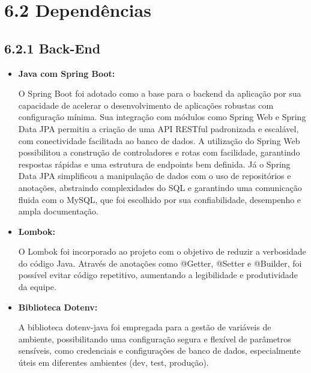\documentclass[12pt,a4paper]{report}
\begin{document}
\section{6.2 Dependências}

\subsection{6.2.1 Back-End}
\begin{itemize}

\item \textbf{Java com Spring Boot: } 

O Spring Boot foi adotado como a base para o backend da aplicação por sua capacidade de acelerar o desenvolvimento de aplicações robustas com configuração mínima. Sua integração com módulos como Spring Web e Spring Data JPA permitiu a criação de uma API RESTful padronizada e escalável, com conectividade facilitada ao banco de dados.
A utilização do Spring Web possibilitou a construção de controladores e rotas com facilidade, garantindo respostas rápidas e uma estrutura de endpoints bem definida. Já o Spring Data JPA simplificou a manipulação de dados com o uso de repositórios e anotações, abstraindo complexidades do SQL e garantindo uma comunicação fluida com o MySQL, que foi escolhido por sua confiabilidade, desempenho e ampla documentação.

\item  \textbf{Lombok: }

O Lombok foi incorporado ao projeto com o objetivo de reduzir a verbosidade do código Java. Através de anotações como @Getter, @Setter e @Builder, foi possível evitar código repetitivo, aumentando a legibilidade e produtividade da equipe.

\item \textbf {Biblioteca Dotenv: }

A biblioteca dotenv-java foi empregada para a gestão de variáveis de ambiente, possibilitando uma configuração segura e flexível de parâmetros sensíveis, como credenciais e configurações de banco de dados, especialmente úteis em diferentes ambientes (dev, test, produção).  

\end{itemize} 
\end{document}
